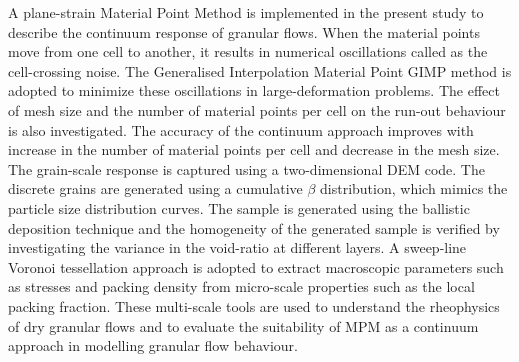 A plane-strain Material Point Method is implemented in the present study to 
describe the continuum response of granular flows. When the material points 
move from one cell to another, it results in numerical oscillations called as 
the cell-crossing noise. The Generalised Interpolation Material Point GIMP 
method is adopted to minimize these oscillations in large-deformation problems. 
The effect of mesh size and the number of material points per cell on the 
run-out behaviour is also investigated. The accuracy of the continuum approach 
improves with increase in the number of material points per cell and decrease 
in the mesh size. The grain-scale response is captured using a two-dimensional 
DEM code. The discrete grains are generated using a cumulative $\beta$ 
distribution, which mimics the particle size distribution curves. The sample is 
generated using the ballistic deposition technique and the homogeneity of the 
generated sample is verified by investigating the variance in the void-ratio at 
different layers. A sweep-line Voronoi tessellation approach is adopted to 
extract macroscopic parameters such as stresses and packing density from 
micro-scale properties such as the local packing fraction. These multi-scale 
tools are used to understand the rheophysics of dry granular flows and to 
evaluate the suitability of MPM as a continuum approach in modelling granular 
flow behaviour.
